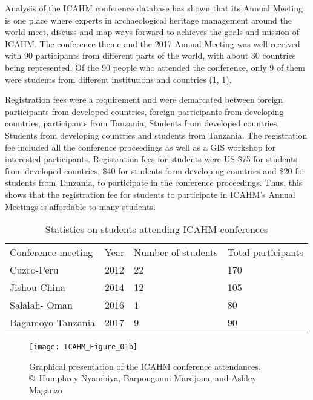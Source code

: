 Analysis of the ICAHM conference database has shown that its Annual Meeting is one place where experts in archaeological heritage management around the world meet, discuss and map ways forward to achieves the goals and mission of ICAHM. The conference theme and the 2017 Annual Meeting was well received with 90 participants from different parts of the world, with about 30 countries being represented. Of the 90 people who attended the conference, only 9 of them were students from different institutions and countries (\cref{tab:ICAHM_Table_01}, \cref{fig:ICAHM_Figure_01b}).

Registration fees were a requirement and were demarcated between foreign participants from developed countries, foreign participants from developing countries, participants from Tanzania, Students from developed countries, Students from developing countries and students from Tanzania. The registration fee included all the conference proceedings as well as a GIS workshop for interested participants. Registration fees for students were US \$75 for students from developed countries, \$40 for students form developing countries and \$20 for students from Tanzania, to participate in the conference proceedings. Thus, this shows that the registration fee for students to participate in ICAHM’s Annual Meetings is affordable to many students.

\begin{table}[]
	\centering
	\caption{Statistics on students attending ICAHM conferences}
	\label{tab:ICAHM_Table_01}
	\begin{tabular}{llll}
		Conference meeting & Year & Number of students & Total participants \\
		Cuzco-Peru         & 2012 & 22                 & 170                \\
		Jishou-China       & 2014 & 12                 & 105                \\
		Salalah- Oman      & 2016 & 1                  & 80                 \\
		Bagamoyo-Tanzania  & 2017 & 9                  & 90
	\end{tabular}
\end{table}

\begin{figure}[!htb]
	\texttt{[image: ICAHM\_Figure\_01b]}
	\caption{Graphical presentation of the ICAHM conference attendances.
		{\normalfont\scriptsize \\ \copyright\
			Humphrey Nyambiya, Barpougouni Mardjoua, and Ashley Maganzo %
	}}
	\label{fig:ICAHM_Figure_01b}
\end{figure}

